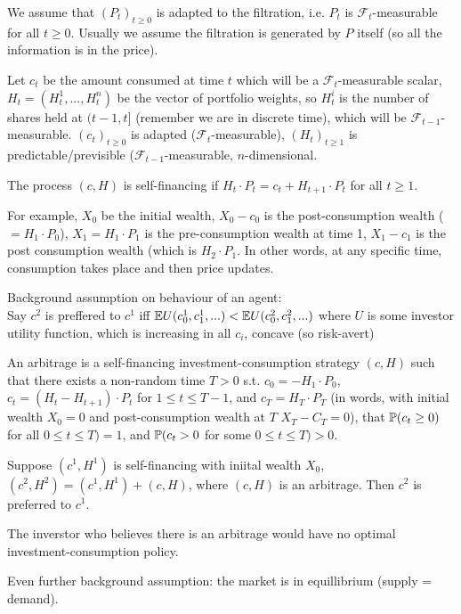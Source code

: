 \documentclass[a4paper]{article}
\begin{document}
We assume that $(P_t)_{t \geq 0}$ is adapted to the filtration, i.e. $P_t$ is $\mathcal{F}_t$-measurable for all $t \geq 0$. Usually we assume the filtration is generated by $P$ itself (so all the information is in the price).

Let $c_t$ be the amount consumed at time $t$ which will be a $\mathcal{F}_t$-measurable scalar, $H_t = (H_t^1,...,H_t^n)$ be the vector of portfolio weights, so $H_t^i$ is the number of shares held at $(t-1,t]$ (remember we are in discrete time), which will be $\mathcal{F}_{t-1}$-measurable. $(c_t)_{t \geq 0}$ is adapted ($\mathcal{F}_t$-measurable), $(H_t)_{t \geq 1}$ is predictable/previsible ($\mathcal{F}_{t-1}$-measurable, $n$-dimensional. 

\begin{defi}
The process $(c,H)$ is self-financing if $H_t\cdot P_t = c_t+H_{t+1} \cdot P_t$ for all $t \geq 1$.
\end{defi}

For example, $X_0$ be the initial wealth, $X_0-c_0$ is the post-consumption wealth ($=H_1 \cdot P_0$), $X_1=H_1 \cdot P_1$ is the pre-consumption wealth at time 1, $X_1-c_1$ is the post consumption wealth (which is $H_2\cdot P_1$. In other words, at any specific time, consumption takes place and then price updates.

Background assumption on behaviour of an agent:\\
Say $c^2$ is preffered to $c^1$ iff $\E U(c_0^1,c_1^1,...) < \E U(c_0^2,c_1^2,...)$ where $U$ is some investor utility function, which is increasing in all $c_i$, concave (so risk-avert)

\begin{defi}
An arbitrage is a self-financing investment-consumption strategy $(c,H)$ such that there exists a non-random time $T>0$ s.t. $c_0 = -H_1 \cdot P_0$, $c_t = (H_t - H_{t+1}) \cdot P_t$ for $1 \leq t \leq T-1$, and $c_T =H_T \cdot P_T$ (in words, with initial wealth $X_0 = 0$ and post-consumption wealth at $T$ $X_T-C_T=0$), that $\P(c_t \geq 0)$ for all $0 \leq t \leq T) = 1$, and $\P(c_t > 0$ for some $0 \leq t \leq T) > 0$.
\end{defi}

Suppose $(c^1,H^1)$ is self-financing with iniital wealth $X_0$, $(c^2,H^2) = (c^1,H^1) + (c,H)$, where $(c,H)$ is an arbitrage. Then $c^2$ is preferred to $c^1$.

The inverstor who believes there is an arbitrage would have no optimal investment-consumption policy.

Even further background assumption: the market is in equillibrium (supply = demand).
\end{document}
